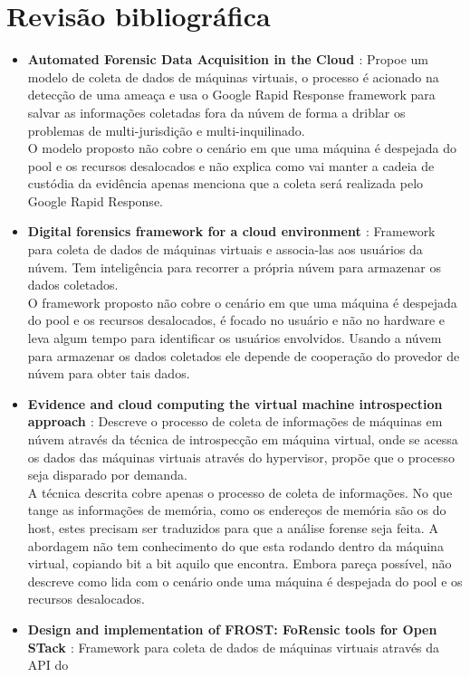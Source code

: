 \documentclass[12pt,				%
	openright,			%
	oneside,			%
	a4paper,			%
	english,			%
	brazil				%
	]{abntex2}
\begin{document}
\chapter{Revisão bibliográfica} \label{chap:related}
\begin{itemize}
 \item \textbf{Automated Forensic Data Acquisition in the Cloud \cite{Reichert2015} }: Propoe um modelo de coleta de dados de máquinas virtuais, o processo é acionado 
 na detecção de uma ameaça e usa o Google Rapid Response framework para salvar as informações coletadas fora da núvem de forma a driblar os problemas de multi-jurisdição e multi-inquilinado.\\
 O modelo proposto não cobre o cenário em que uma máquina é despejada do pool e os recursos desalocados e não explica como vai manter a cadeia de custódia da evidência apenas menciona que
 a coleta será realizada pelo Google Rapid Response.
 \item \textbf{Digital forensics framework for a cloud environment \cite{George2012} }: Framework para coleta de dados de máquinas virtuais e associa-las aos usuários da 
 núvem. Tem inteligência para recorrer a própria núvem para armazenar os dados coletados.\\
 O framework proposto não cobre o cenário em que uma máquina é despejada do pool e os recursos desalocados, é focado no usuário e não no hardware e leva algum tempo para
 identificar os usuários envolvidos. Usando a núvem para armazenar os dados coletados ele depende de cooperação do provedor de núvem para obter tais dados.
 \item \textbf{Evidence and cloud computing the virtual machine introspection approach \cite{Poisel2013} }: Descreve o processo de coleta de informações de máquinas
 em núvem através da técnica de introspecção em máquina virtual, onde se acessa os dados das máquinas virtuais através do hypervisor, propõe que o processo seja disparado por demanda.\\
 A técnica descrita cobre apenas o processo de coleta de informações. No que tange as informações de memória, como os endereços de memória são os do host, estes precisam ser traduzidos
 para que a análise forense seja feita. A abordagem não tem conhecimento do que esta rodando dentro da máquina virtual, copiando bit a bit aquilo que encontra. Embora pareça
 possível, não descreve como lida com o cenário onde uma máquina é despejada do pool e os recursos desalocados.
 \item \textbf{Design and implementation of FROST: FoRensic tools for Open STack \cite{Dykstra2013} }: Framework para coleta de dados de máquinas virtuais através da API do 

\end{itemize}
\end{document}
